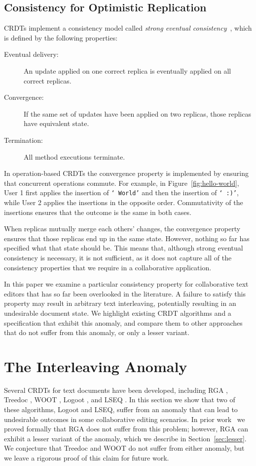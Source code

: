 \documentclass[sigconf]{acmart}
\begin{document}
\subsection{Consistency for Optimistic Replication}

CRDTs implement a consistency model called \emph{strong eventual consistency}~\cite{Shapiro:2011un,Gomes:2017gy}, which is defined by the following properties:
\begin{description}
\item[Eventual delivery:] An update applied on one correct replica is eventually applied on all correct replicas.
\item[Convergence:] If the same set of updates have been applied on two replicas, those replicas have equivalent state.
\item[Termination:] All method executions terminate.
\end{description}
In operation-based CRDTs the convergence property is implemented by ensuring that concurrent operations commute.
For example, in Figure~\ref{fig:hello-world}, User 1 first applies the insertion of \texttt{` World'} and then the insertion of \texttt{` :)'}, while User 2 applies the insertions in the opposite order.
Commutativity of the insertions ensures that the outcome is the same in both cases.

When replicas mutually merge each others' changes, the convergence property ensures that those replicas end up in the same state.
However, nothing so far has specified what that state should be.
This means that, although strong eventual consistency is necessary, it is not sufficient, as it does not capture all of the consistency properties that we require in a collaborative application.

In this paper we examine a particular consistency property for collaborative text editors that has so far been overlooked in the literature.
A failure to satisfy this property may result in arbitrary text interleaving, potentially resulting in an undesirable document state.
We highlight existing CRDT algorithms and a specification that exhibit this anomaly, and compare them to other approaches that do not suffer from this anomaly, or only a lesser variant.


\section{The Interleaving Anomaly}\label{sec:anomaly}

Several CRDTs for text documents have been developed, including RGA \cite{Roh:2011dw}, Treedoc \cite{Preguica:2009fz}, WOOT \cite{Oster:2006wj}, Logoot \cite{Weiss:2009ht,Weiss:2010hx}, and LSEQ \cite{Nedelec:2013ky,Nedelec:2016eo}.
In this section we show that two of these algorithms, Logoot and LSEQ, suffer from an anomaly that can lead to undesirable outcomes in some collaborative editing scenarios.
In prior work~\cite{ExtendedVersion,AFP} we proved formally that RGA does not suffer from this problem; however, RGA can exhibit a lesser variant of the anomaly, which we describe in Section~\ref{sec:lesser}.
We conjecture that Treedoc and WOOT do not suffer from either anomaly, but we leave a rigorous proof of this claim for future work.
\end{document}
